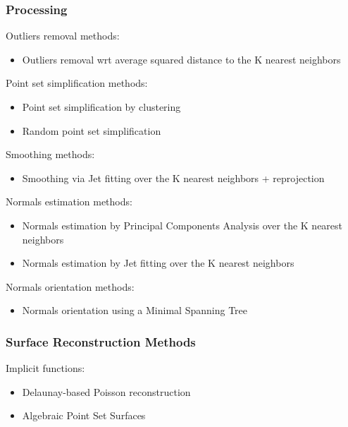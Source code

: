 \subsubsection{Processing}

Outliers removal methods:

\begin{itemize}
\item Outliers removal wrt average squared distance to the K nearest neighbors
\end{itemize}

Point set simplification methods:

\begin{itemize}
\item Point set simplification by clustering
\item Random point set simplification
\end{itemize}

Smoothing methods:

\begin{itemize}
\item Smoothing via Jet fitting over the K nearest neighbors + reprojection
\end{itemize}

Normals estimation methods:

\begin{itemize}
\item Normals estimation by Principal Components Analysis over the K nearest neighbors
\item Normals estimation by Jet fitting over the K nearest neighbors
\end{itemize}

Normals orientation methods:

\begin{itemize}
\item Normals orientation using a Minimal Spanning Tree \cite{cgal:hddms-srup-92}
\end{itemize}


\subsubsection{Surface Reconstruction Methods}

Implicit functions:

\begin{itemize}
\item Delaunay-based Poisson reconstruction \cite{Kazhdan06}
\item Algebraic Point Set Surfaces \cite{Guennebaud07}
\end{itemize}

